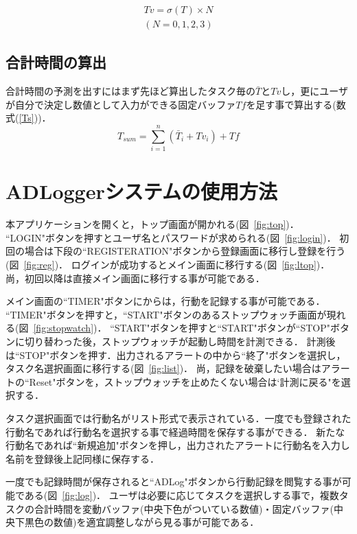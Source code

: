 \begin{eqnarray}
\label{Tv}
Tv=\sigma (T)×N \\
(N= 0, 1,2, 3 )\nonumber
\end{eqnarray}

\subsection{合計時間の算出}

合計時間の予測を出すにはまず先ほど算出したタスク毎の$\bar{T}$と$Tv$し，更にユーザが自分で決定し数値として入力ができる固定バッファ$Tf$を足す事で算出する(数式(\ref{Ts}))．
\begin{equation}
\label{Ts}
T_{sum}= \displaystyle\sum_{i=1}^{n} (\bar{T}_{i} + Tv_{i})+Tf
\end{equation}


\section{ADLoggerシステムの使用方法}
本アプリケーションを開くと，トップ画面が開かれる(図~\ref{fig:top})．
``LOGIN"ボタンを押すとユーザ名とパスワードが求められる(図~\ref{fig:login})．
初回の場合は下段の``REGISTERATION"ボタンから登録画面に移行し登録を行う(図~\ref{fig:reg})．
ログインが成功するとメイン画面に移行する(図~\ref{fig:ltop})．
尚，初回以降は直接メイン画面に移行する事が可能である．

メイン画面の``TIMER"ボタンにからは，行動を記録する事が可能である．
``TIMER"ボタンを押すと，``START"ボタンのあるストップウォッチ画面が現れる(図~\ref{fig:stopwatch})．
``START"ボタンを押すと``START"ボタンが``STOP"ボタンに切り替わった後，ストップウォッチが起動し時間を計測できる．
計測後は``STOP"ボタンを押す．出力されるアラートの中から``終了"ボタンを選択し，タスク名選択画面に移行する(図~\ref{fig:list})．
尚，記録を破棄したい場合はアラートの``Reset"ボタンを，ストップウォッチを止めたくない場合は`計測に戻る"を選択する．

タスク選択画面では行動名がリスト形式で表示されている．一度でも登録された行動名であれば行動名を選択する事で経過時間を保存する事ができる．
新たな行動名であれば``新規追加"ボタンを押し，出力されたアラートに行動名を入力し名前を登録後上記同様に保存する．

一度でも記録時間が保存されると``ADLog"ボタンから行動記録を閲覧する事が可能である(図~\ref{fig:log})．
ユーザは必要に応じてタスクを選択しする事で，複数タスクの合計時間を変動バッファ(中央下色がついている数値)・固定バッファ(中央下黒色の数値)を適宜調整しながら見る事が可能である．

